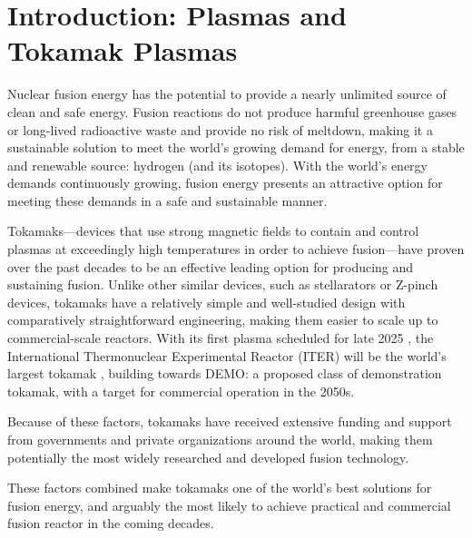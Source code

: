 \chapter{Introduction: Plasmas and Tokamak Plasmas}    
    Nuclear fusion energy has the potential to provide a nearly unlimited source of clean and safe energy. Fusion reactions do not produce harmful greenhouse gases or long-lived radioactive waste and provide no risk of meltdown, making it a sustainable solution to meet the world's growing demand for energy, from a stable and renewable source: hydrogen (and its isotopes). With the world's energy demands continuously growing, fusion energy presents an attractive option for meeting these demands in a safe and sustainable manner.

    Tokamaks---devices that use strong magnetic fields to contain and control plasmas at exceedingly high temperatures in order to achieve fusion---have proven over the past decades to be an effective leading option for producing and sustaining fusion. Unlike other similar devices, such as stellarators or Z-pinch devices, tokamaks have a relatively simple and well-studied  design with comparatively straightforward engineering, making them easier to scale up to commercial-scale reactors. With its first plasma scheduled for late 2025 \cite{ITER_schedule}, the International Thermonuclear Experimental Reactor (ITER) will be the world's largest tokamak \cite{Meade_2009, ITER_plan}, building towards DEMO: a proposed class of demonstration tokamak, with a target for commercial operation in the 2050s.
    
    Because of these factors, tokamaks have received extensive funding and support from governments and private organizations around the world, making them potentially the most widely researched and developed fusion technology.
    
    These factors combined make tokamaks one of the world's best solutions for fusion energy, and arguably the most likely to achieve practical and commercial fusion reactor in the coming decades.

